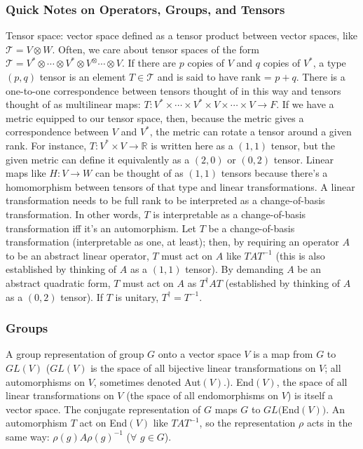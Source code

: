 \documentclass[11pt]{article}
\begin{document}
	\subsubsection*{Quick Notes on Operators, Groups, and Tensors}
	Tensor space: vector space defined as a tensor product between vector spaces, like $\mathcal{T} = V\otimes W$. Often, we care about tensor spaces of the form $\mathcal{T} = V^*\otimes\cdots\otimes V^*\otimes V^\otimes\cdots\otimes V$. If there are $p$ copies of $V$ and $q$ copies of $V^*$, a type $(p, q)$ tensor is an element $T\in\mathcal{T}$ and is said to have rank = $p+q$. There is a one-to-one correspondence between tensors thought of in this way and tensors thought of as multilinear maps: $T: V^*\times\cdots\times V^*\times V\times \cdots \times V\rightarrow F$. If we have a metric equipped to our tensor space, then, because the metric gives a correspondence between $V$ and $V^*$, the metric can rotate a tensor around a given rank. For instance, $T: V^*\times V\rightarrow \mathbb{R}$ is written here as a $(1, 1)$ tensor, but the given metric can define it equivalently as a $(2, 0)$ or $(0, 2)$ tensor. Linear maps like $H: V\rightarrow W$ can be thought of as $(1, 1)$ tensors because there's a homomorphism between tensors of that type and linear transformations. A linear transformation needs to be full rank to be interpreted as a change-of-basis transformation. In other words, $T$ is interpretable as a change-of-basis transformation iff it's an automorphism. Let $T$ be a change-of-basis transformation (interpretable as one, at least); then, by requiring an operator $A$ to be an abstract linear operator, $T$ must act on $A$ like $TAT^{-1}$ (this is also established by thinking of $A$ as a $(1, 1)$ tensor). By demanding $A$ be an abstract quadratic form, $T$ must act on $A$ as $T^\dagger A T$ (established by thinking of $A$ as a $(0, 2)$ tensor). If $T$ is unitary, $T^\dagger=T^{-1}$. 
	
	\subsubsection*{Groups}
	A group representation of group $G$ onto a vector space $V$ is a map from $G$ to $GL(V)$ ($GL(V)$ is the space of all bijective linear transformations on $V$; all automorphisms on $V$, sometimes denoted Aut$(V)$.). End$(V)$, the space of all linear transformations on $V$ (the space of all endomorphisms on $V$) is itself a vector space. The conjugate representation of $G$ maps $G$ to $GL($End$(V))$. An automorphism $T$ act on End$(V)$ like $TAT^{-1}$, so the representation $\rho$ acts in the same way: $\rho(g) A \rho(g)^{-1}$ ($\forall$ $g\in G$).
	
\end{document}

